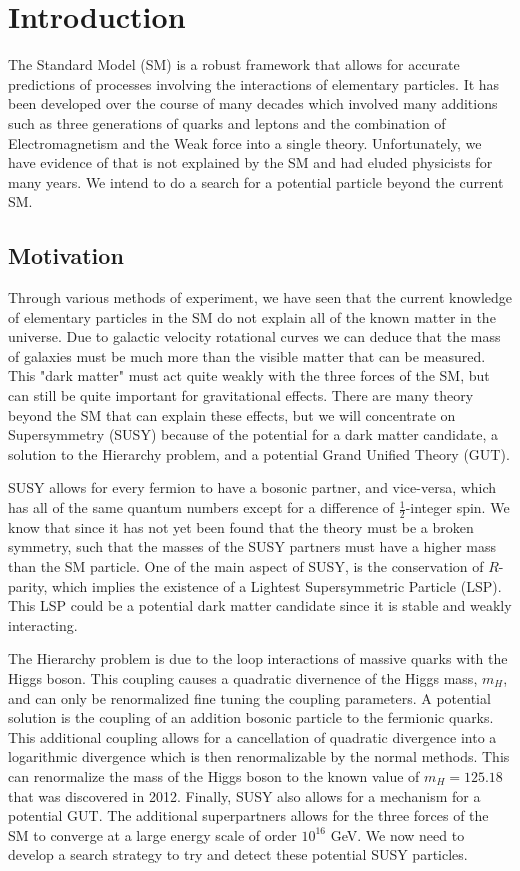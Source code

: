 \chapter{Introduction}
\label{ch:Intro}

The Standard Model (SM) is a robust framework that allows for accurate predictions of processes involving the interactions of elementary particles. It has been developed over the course of many decades which involved many additions such as three generations of quarks and leptons and the combination of Electromagnetism and the Weak force into a single theory. Unfortunately, we have evidence of that is not explained by the SM and had eluded physicists for many years. We intend to do a search for a potential particle beyond the current SM.

\section{Motivation}
\label{sec:Motivation}

Through various methods of experiment, we have seen that the current knowledge of elementary particles in the SM do not explain all of the known matter in the universe. Due to galactic velocity rotational curves we can deduce that the mass of galaxies must be much more than the visible matter that can be measured. This "dark matter" must act quite weakly with the three forces of the SM, but can still be quite important for gravitational effects. There are many theory beyond the SM that can explain these effects, but we will concentrate on Supersymmetry (SUSY) because of the potential for a dark matter candidate, a solution to the Hierarchy problem, and a potential Grand Unified Theory (GUT).

SUSY allows for every fermion to have a bosonic partner, and vice-versa, which has all of the same quantum numbers except for a difference of $\frac{1}{2}$-integer spin. We know that since it has not yet been found that the theory must be a broken symmetry, such that the masses of the SUSY partners must have a higher mass than the SM particle. One of the main aspect of SUSY, is the conservation of $R$-parity, which implies the existence of a Lightest Supersymmetric Particle (LSP). This LSP could be a potential dark matter candidate since it is stable and weakly interacting. 

The Hierarchy problem is due to the loop interactions of massive quarks with the Higgs boson. This coupling causes a quadratic divernence of the Higgs mass, $m_H$, and can only be renormalized fine tuning the coupling parameters. A potential solution is the coupling of an addition bosonic particle to the fermionic quarks. This additional coupling allows for a cancellation of quadratic divergence into a logarithmic divergence which is then renormalizable by the normal methods. This can renormalize the mass of the Higgs boson to the known value of $m_H=125.18$ \GeV{} that was discovered in 2012. Finally, SUSY also allows for a mechanism for a potential GUT. The additional superpartners allows for the three forces of the SM to converge at a large energy scale of order $10^{16}$ GeV. We now need to develop a search strategy to try and detect these potential SUSY particles.


